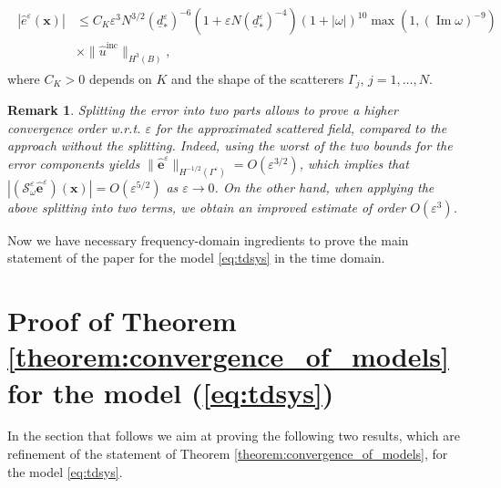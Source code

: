 \documentclass[]{article}
\newtheorem{remark}{Remark}
\numberwithin{equation}{section}
\numberwithin{theorem}{section}
\numberwithin{lemma}{section}
\numberwithin{corollary}{section}
\numberwithin{proposition}{section}
\numberwithin{definition}{section}
\newcommand{\bx}{\boldsymbol{x}}
\newcommand{\re}{\varepsilon}
\renewcommand{\vec}{\boldsymbol}
\newcommand{\inc}{\operatorname{inc}}
\begin{document}
	\begin{align}
		\label{eq:bound_field_FD}
		\begin{split}
			|\hat{{e}}^{\re}(\boldsymbol{x})| &\leq C_K \re^{3}N^{3/2}(\underline{d}^{\re}_*)^{-6}
			\left(1+\re N(\underline{d}^{\re}_*)^{-4}\right)(1+|\omega|)^{10}\max(1, (\operatorname{Im}\omega)^{-9})\\
			&\times  \|\hat{u}^{\inc}\|_{H^3(B)},
		\end{split}
	\end{align}
	where $C_K>0$ depends on $K$ and the shape of the scatterers $\Gamma_j,\, j=1,\ldots, N$.
	\begin{remark} 
		Splitting the error into two parts allows to prove a higher convergence order w.r.t. $\re$  for the approximated scattered field, compared to the approach without the splitting. Indeed, using the worst of the two bounds for the error components yields $\| \hat{\vec{e}}^{\re}  \|_{H^{-1/2}(\Gamma^{\re})}= O(\re^{3/2})$, which implies that \( |(\mathcal{S}^{\re}_{\omega} \hat{\vec{e}}^{\re})(\bx)| = O(\re^{5/2}) \) as \( \re \to 0 \). On the other hand, when applying the above splitting into two terms, we obtain an improved estimate of order $O(\re^3)$.
	\end{remark} 
	Now we have necessary frequency-domain ingredients to prove the main statement of the paper for the model \eqref{eq:tdsys} in the time domain. 
	\section{Proof of Theorem \ref{theorem:convergence_of_models} for the model (\ref{eq:tdsys})}
	\label{sec:error_analysis}
	In the section that follows we aim at proving the following two results, which are refinement of the statement of Theorem \ref{theorem:convergence_of_models}, for the model \eqref{eq:tdsys}. 
\end{document}
